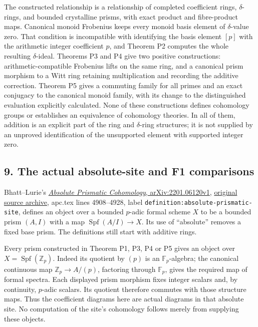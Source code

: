 \documentclass[
]{article}
\begin{document}
The constructed relationship is a relationship of completed coefficient
rings, \(\delta\)-rings, and bounded crystalline prisms, with exact
product and fibre-product maps. Canonical monoid Frobenius keeps every
monoid basis element of \(\delta\)-value zero. That condition is
incompatible with identifying the basis element \([p]\) with the
arithmetic integer coefficient \(p\), and Theorem P2 computes the whole
resulting \(\delta\)-ideal. Theorems P3 and P4 give two positive
constructions: arithmetic-compatible Frobenius lifts on the same ring,
and a canonical prism morphism to a Witt ring retaining multiplication
and recording the additive correction. Theorem P5 gives a commuting
family for all primes and an exact conjugacy to the canonical monoid
family, with its change to the distinguished evaluation explicitly
calculated. None of these constructions defines cohomology groups or
establishes an equivalence of cohomology theories. In all of them,
addition is an explicit part of the ring and \(\delta\)-ring structures;
it is not supplied by an unproved identification of the unsupported
element with supported integer zero.

\subsection{9. The actual absolute-site and F1
comparisons}\label{the-actual-absolute-site-and-f1-comparisons}

Bhatt--Lurie's \href{https://arxiv.org/abs/2201.06120v1}{\emph{Absolute
Prismatic Cohomology}, arXiv:2201.06120v1},
\href{https://arxiv.org/src/2201.06120v1}{original source archive},
apc.tex lines 4908--4928, label
\texttt{definition:absolute-prismatic-site}, defines an object over a
bounded \(p\)-adic formal scheme \(X\) to be a bounded prism \((A,I)\)
with a map \(\operatorname{Spf}(A/I)\to X\). Its use of ``absolute''
removes a fixed base prism. The definitions still start with additive
rings.

Every prism constructed in Theorem P1, P3, P4 or P5 gives an object over
\(X=\operatorname{Spf}(\mathbb Z_p)\). Indeed its quotient by \((p)\) is
an \(\mathbb F_p\)-algebra; the canonical continuous map
\(\mathbb Z_p\to A/(p)\), factoring through \(\mathbb F_p\), gives the
required map of formal spectra. Each displayed prism morphism fixes
integer scalars and, by continuity, \(p\)-adic scalars. Its quotient
therefore commutes with those structure maps. Thus the coefficient
diagrams here are actual diagrams in that absolute site. No computation
of the site's cohomology follows merely from supplying these objects.
\end{document}
